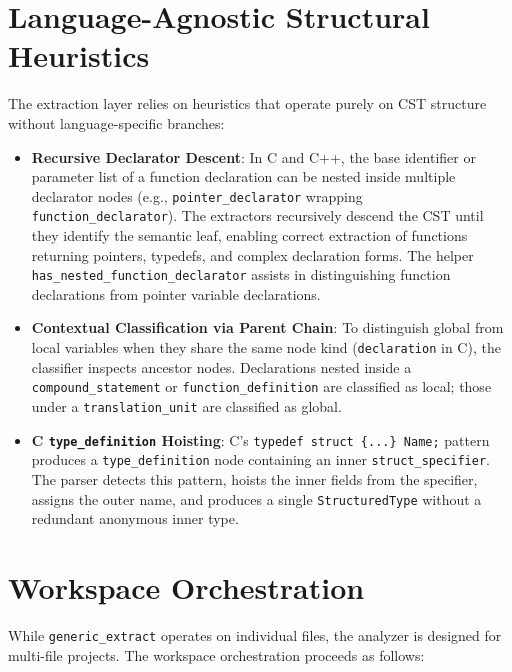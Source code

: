 \section{Language-Agnostic Structural Heuristics}
\label{sec:structural_heuristics}

The extraction layer relies on heuristics that operate purely on CST
structure without language-specific branches:

\begin{itemize}
  \item \textbf{Recursive Declarator Descent}: In C and C++, the base
    identifier or parameter list of a function declaration can be
    nested inside multiple declarator nodes (e.g.,
      \texttt{pointer\_declarator} wrapping
    \texttt{function\_declarator}). The extractors recursively
    descend the CST until they identify the semantic leaf, enabling
    correct extraction of functions returning pointers, typedefs, and
    complex declaration forms. The helper
    \texttt{has\_nested\_function\_declarator} assists in
    distinguishing function declarations from pointer variable declarations.

  \item \textbf{Contextual Classification via Parent Chain}: To
    distinguish global from local variables when they share the same
    node kind (\texttt{declaration} in C), the classifier inspects
    ancestor nodes. Declarations nested inside a
    \texttt{compound\_statement} or \texttt{function\_definition} are
    classified as local; those under a \texttt{translation\_unit} are
    classified as global.

  \item \textbf{C \texttt{type\_definition} Hoisting}: C's
    \texttt{typedef struct \{...\} Name;} pattern produces a
    \texttt{type\_definition} node containing an inner
    \texttt{struct\_specifier}. The parser detects this pattern,
    hoists the inner fields from the specifier, assigns the outer
    name, and produces a single \texttt{StructuredType} without a
    redundant anonymous inner type.
\end{itemize}

\section{Workspace Orchestration}
\label{sec:workspace_orchestration}

While \texttt{generic\_extract} operates on individual files, the
analyzer is designed for multi-file projects. The workspace
orchestration proceeds as follows:

